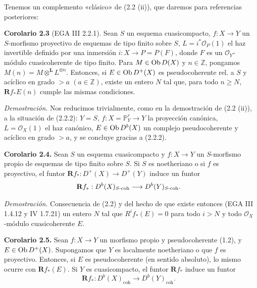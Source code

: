 \providecommand{\sisi}[2]{#2}

Tenemos un complemento «clásico» de (2.2 (ii)), que daremos para referencias posteriores:

\textbf{Corolario 2.3} (EGA III 2.2.1). Sean \(S\) un esquema cuasicompacto, \(f:X\to Y\) un \(S\)-morfismo proyectivo de esquemas de tipo finito sobre \(S\), \(L=i^*\mathcal O_P(1)\) el haz invertible definido por una inmersión \(i:X\to P=P(F)\), donde \(F\) es un \(\mathcal O_Y\)-módulo cuasicoherente de tipo finito. Para \(M\in\operatorname{Ob} D(X)\) y \(n\in\mathbb Z\), pongamos \(M(n)=M\otimes^{\mathbf L} L^{\otimes n}\). Entonces, si \(E\in\operatorname{Ob} D^+(X)\) es pseudocoherente rel. a \(S\) y acíclico en grado \(>a\) \((a\in\mathbb Z)\), existe un entero \(N\) tal que, para todo \(n\geq N\), \(\mathbf Rf_*E(n)\) cumple las mismas condiciones.

\emph{Demostración.} Nos reducimos trivialmente, como en la demostración de (2.2 (ii)), a la situación de (2.2.2): \(Y=S\), \(f:X=\mathbb P^r_Y\to Y\) la proyección canónica, \(L=\mathcal O_X(1)\) el haz canónico, \(E\in\operatorname{Ob} D^b(X)\) un complejo pseudocoherente y acíclico en grado \(\sisi{\geq}{>} a\), y se concluye gracias a (2.2.2).

\textbf{Corolario 2.4.} Sean \(S\) un esquema cuasicompacto y \(f:X\to Y\) un \(S\)-morfismo propio de esquemas de tipo finito sobre \(S\). Si \(S\) es noetheriano o si \(f\) es proyectivo, el funtor \(\mathbf Rf_*:D^+(X)\longrightarrow D^+(Y)\) induce un funtor
\[
  \mathbf Rf_*:D^b(X)_{S\text{-}\mathrm{coh}}\longrightarrow D^b(Y)_{S\text{-}\mathrm{coh}}.
\]

\emph{Demostración.} Consecuencia de (2.2) y del hecho de que existe entonces (EGA III 1.4.12 y IV 1.7.21) un entero \(N\) tal que \(R^if_*(E)=0\) para todo \(i>N\) y todo \(\mathcal O_X\)-módulo cuasicoherente \(E\).

\textbf{Corolario 2.5.} Sean \(f:X\to Y\) un morfismo propio y pseudocoherente (1.2), y \(E\in\operatorname{Ob} D^+(X)\). Supongamos que \(Y\) es localmente noetheriano o que \(f\) es proyectivo. Entonces, si \(E\) es pseudocoherente (en sentido absoluto), lo mismo ocurre con \(\mathbf Rf_*(E)\). Si \(Y\) es cuasicompacto, el funtor \(\mathbf Rf_*\) induce un funtor
\[
  \mathbf Rf_*:D^b(X)_{\mathrm{coh}}\longrightarrow D^b(Y)_{\mathrm{coh}}.
\]

